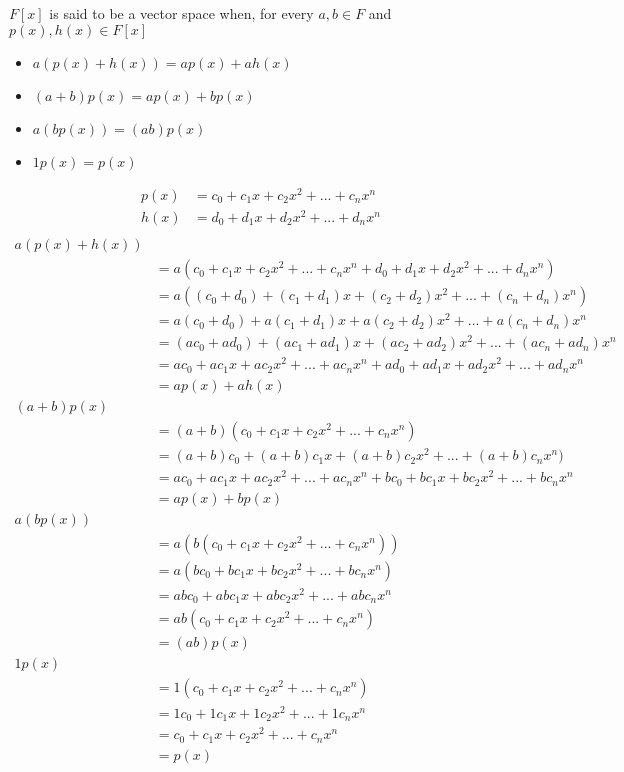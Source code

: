 \documentclass{article}
\begin{document}
\section{}
$F[x]$ is said to be a vector space when, for every $a, b \in F$ and $p(x), h(x) \in F[x]$
\begin{itemize}
\item $a(p(x) + h(x)) = ap(x) + ah(x)$
\item $(a + b)p(x) = ap(x) + bp(x)$
\item $a(bp(x)) = (ab)p(x)$
\item $1p(x) = p(x)$
\end{itemize}
\[
\begin{split}
p(x) &= c_0 + c_1x + c_2x^2 + ... + c_nx^n \\
h(x) &= d_0 + d_1x + d_2x^2 + ... + d_nx^n \\
\end{split}
\]
\[
\begin{split}
a(p(x) + h(x)) \\
&= a(c_0 + c_1x + c_2x^2 + ... + c_nx^n + d_0 + d_1x + d_2x^2 + ... + d_nx^n) \\
&= a((c_0 + d_0) + (c_1 + d_1)x + (c_2 + d_2)x^2 + ... + (c_n + d_n)x^n) \\
&= a(c_0 + d_0) + a(c_1 + d_1)x + a(c_2 + d_2)x^2 + ... + a(c_n + d_n)x^n \\
&= (ac_0 + ad_0) + (ac_1 + ad_1)x + (ac_2 + ad_2)x^2 + ... + (ac_n + ad_n)x^n \\
&= ac_0 + ac_1x + ac_2x^2 + ... + ac_nx^n + ad_0 + ad_1x + ad_2x^2 + ... + ad_nx^n \\
&= ap(x) + ah(x) \\
(a + b)p(x) \\
&= (a + b)(c_0 + c_1x + c_2x^2 + ... + c_nx^n) \\
&= (a + b)c_0 + (a + b)c_1x + (a + b)c_2x^2 + ... + (a + b)c_nx^n) \\
&= ac_0 + ac_1x + ac_2x^2 + ... + ac_nx^n + bc_0 + bc_1x + bc_2x^2 + ... + bc_nx^n \\
&= ap(x) + bp(x) \\
a(bp(x)) \\
&= a(b(c_0 + c_1x + c_2x^2 + ... + c_nx^n)) \\
&= a(bc_0 + bc_1x + bc_2x^2 + ... + bc_nx^n) \\
&= abc_0 + abc_1x + abc_2x^2 + ... + abc_nx^n \\
&= ab(c_0 + c_1x + c_2x^2 + ... + c_nx^n) \\
&= (ab)p(x) \\
1p(x) \\
&= 1(c_0 + c_1x + c_2x^2 + ... + c_nx^n) \\
&= 1c_0 + 1c_1x + 1c_2x^2 + ... + 1c_nx^n \\
&= c_0 + c_1x + c_2x^2 + ... + c_nx^n \\
&= p(x) \\
\end{split}
\]
\end{document}
